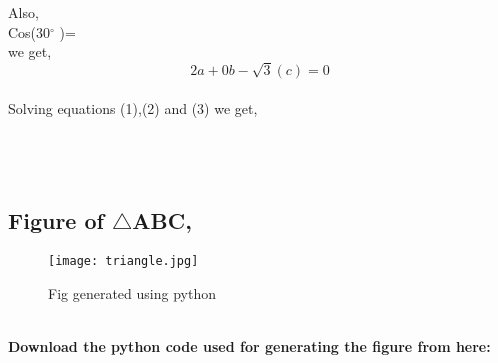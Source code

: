 \documentclass[a4paper,12pt]{article}
\begin{document}
\begin{multicols}{2}
\setlength{\columnsep}{1.5cm}
\setlength{\columnseprule}{0.2pt}
Also,\\
 Cos(30$^{\circ}$ )= \\
       we get,\\
       
   
  \begin{equation}
    2a+0b-\sqrt{3}(c)=0
\end{equation}\\

Solving equations (1),(2) and (3) we get,\\


\\

\\

\\
\end{multicols}

\newpage

\subsection{Figure of $\triangle$ABC,}
\begin{figure}[htp]
    \centering
    \texttt{[image: triangle.jpg]}
    \caption{Fig generated using python}
    \label{fig:2}
\end{figure}
 \\
 
 \textbf{Download the python code used for generating the figure from here:}
 
\end{document}
